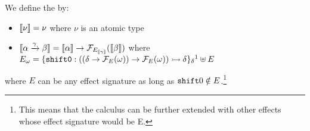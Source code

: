 \begin{definition}
  We define the  by:

  \begin{itemize}
  \item $\llbracket \nu \rrbracket = \nu$ where $\nu$ is an atomic type
  \item
    $\llbracket \alpha \xrightarrow{\gamma} \beta \rrbracket = \llbracket \alpha \rrbracket \to
    \mathcal{F}_{E_{\llbracket \gamma \rrbracket}}(\llbracket \beta \rrbracket)$ where
    $E_\omega = \{ \typedop{shift0}{((\delta \to \FF_E(\omega)) \to
      \FF_E(\omega))}{\delta} \}_\delta\footnotemark \uplus E$
  \end{itemize}


  where $E$ can be any effect signature as long as
  $\mathtt{shift}0 \notin E$.\footnote{This means that the calculus can be further
    extended with other effects whose effect signature would be E.}
\end{definition}

